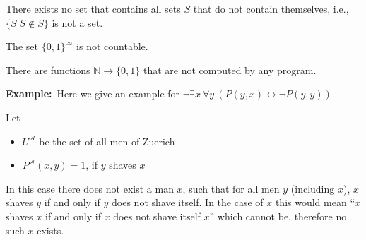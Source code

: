 \documentclass[a4paper]{extarticle}
\newcommand{\Ex}{\textbf{Example:}\ }
\newcommand{\N}{\mathbb{N}}
\newcommand{\cA}{\mathcal{A}}
\begin{document}
\begin{multicols*}{2}
\Cor There exists no set that contains all sets $S$ that do not contain
themselves, i.e., $\{S|S\not\in S\}$ is not a set.

\Cor The set $\{0,1\}^\infty$ is not countable.

\Cor There are functions $\N\to\{0,1\}$ that are not computed by any program.

\Ex Here we give an example for $\lnot \exists x \ \forall y \
(P(y,x)\leftrightarrow\lnot P(y,y))$

Let 
\begin{itemize}
  \item $U^\cA$ be the set of all men of Zuerich
  \item $P^\cA(x,y)=1$, if $y$ shaves $x$
\end{itemize}

In this case there does not exist a man $x$, such that for all men $y$
(including $x$), $x$ shaves $y$ if and only if $y$ does not shave itself. In the
case of $x$ this would mean ``$x$ shaves $x$ if and only if $x$ does not shave
itself $x$'' which cannot be, therefore no such $x$ exists.

%

\end{multicols*}
\end{document}
